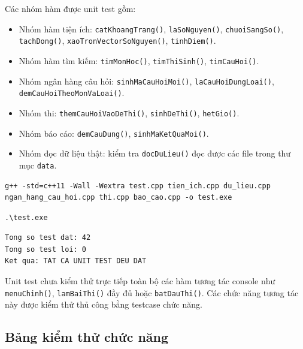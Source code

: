 \documentclass[12pt,a4paper]{report}
\begin{document}
Các nhóm hàm được unit test gồm:

\begin{itemize}
    \item Nhóm hàm tiện ích: \texttt{catKhoangTrang()}, \texttt{laSoNguyen()}, \texttt{chuoiSangSo()}, \texttt{tachDong()}, \texttt{xaoTronVectorSoNguyen()}, \texttt{tinhDiem()}.
    \item Nhóm hàm tìm kiếm: \texttt{timMonHoc()}, \texttt{timThiSinh()}, \texttt{timCauHoi()}.
    \item Nhóm ngân hàng câu hỏi: \texttt{sinhMaCauHoiMoi()}, \texttt{laCauHoiDungLoai()},\\
    \texttt{demCauHoiTheoMonVaLoai()}.
    \item Nhóm thi: \texttt{themCauHoiVaoDeThi()}, \texttt{sinhDeThi()}, \texttt{hetGio()}.
    \item Nhóm báo cáo: \texttt{demCauDung()}, \texttt{sinhMaKetQuaMoi()}.
    \item Nhóm đọc dữ liệu thật: kiểm tra \texttt{docDuLieu()} đọc được các file trong thư mục \texttt{data}.
\end{itemize}

\begin{lstlisting}[caption={Biên dịch chương trình unit test}]
g++ -std=c++11 -Wall -Wextra test.cpp tien_ich.cpp du_lieu.cpp ngan_hang_cau_hoi.cpp thi.cpp bao_cao.cpp -o test.exe
\end{lstlisting}

\begin{lstlisting}[caption={Chạy unit test}]
.\test.exe
\end{lstlisting}

\begin{lstlisting}[caption={Kết quả chạy unit test}]
Tong so test dat: 42
Tong so test loi: 0
Ket qua: TAT CA UNIT TEST DEU DAT
\end{lstlisting}

Unit test chưa kiểm thử trực tiếp toàn bộ các hàm tương tác console như \texttt{menuChinh()}, \texttt{lamBaiThi()} đầy đủ hoặc \texttt{batDauThi()}. Các chức năng tương tác này được kiểm thử thủ công bằng testcase chức năng.

\subsection{Bảng kiểm thử chức năng}
\end{document}
